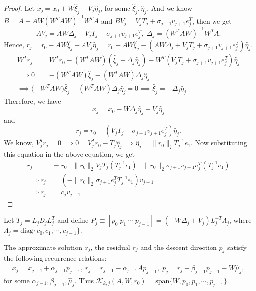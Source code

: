 \documentclass[10pt,a4paper]{article}
\begin{document}
\begin{proof}
Let $x_j=x_0+W\hat{\xi}_j+V_j\hat{\eta}_j$, for some $\hat{\xi}_j, \hat{\eta}_j.$ And we know $B=A-AW(W^TAW)^{-1}W^TA$ and $BV_j=V_jT_j+\sigma_{j+1}v_{j+1}e^T_j$, then we get $$AV_j=AW\Delta_j+V_jT_j+\sigma_{j+1}v_{j+1}e^T_j, \;\Delta_j=(W^TAW)^{-1}W^TA.$$
Hence, $r_j = r_0-AW\hat{\xi}_j-AV_j\hat{\eta}_j = r_0-AW\hat{\xi}_j-(AW\Delta_j+V_jT_j+\sigma_{j+1}v_{j+1}e^T_j)\hat{\eta}_j.$
\begin{align*}
W^Tr_j &= W^Tr_0-(W^TAW)(\hat{\xi}_j-\Delta_j\hat{\eta}_j)-W^T(V_jT_j+\sigma_{j+1}v_{j+1}e^T_j)\hat{\eta}_j \\
\implies 0 &= -(W^TAW)\hat{\xi}_j - (W^TAW)\Delta_j\hat{\eta}_j \\
\implies (&W^TAW)\hat{\xi}_j + (W^TAW)\Delta_j\hat{\eta}_j = 0 \implies \hat{\xi}_j = -\Delta_j\hat{\eta}_j
\end{align*}
Therefore, we have $$x_j = x_0-W\Delta_j\hat{\eta}_j+V_j\hat{\eta}_j$$ and $$r_j = r_0-(V_jT_j+\sigma_{j+1}v_{j+1}e^T_j)\hat{\eta}_j.$$
We know, $V_j^Tr_j=0\implies 0 = V_j^Tr_0-T_j\hat{\eta}_j\implies \hat{\eta}_j = \|r_0\|_2T^{-1}_je_1$. Now substituting this equation in the above equation, we get
\begin{align*}
r_j &= r_0-\|r_0\|_2V_jT_j(T^{-1}_je_1)-\|r_0\|_2\sigma_{j+1}v_{j+1}e^T_j(T^{-1}_je_1) \\
\implies r_j &= (-\|r_0\|_2\sigma_{j+1}e^T_jT^{-1}_je_1)v_{j+1} \\
\implies r_j &= c_jv_{j+1}
\end{align*}
\end{proof}

Let $T_j=L_jD_jL^T_j$ and define $P_j\equiv [p_0\;p_1\;\cdots\;p_{j-1}]=(-W\Delta_j+V_j)L^{-T}_j\Lambda_j$, where $\Lambda_j=\text{diag}\{c_0,c_1,\cdots,c_{j-1}\}.$

\begin{prop}
The approximate solution $x_j$, the residual $r_j$ and the descent direction $p_j$ satisfy the following recurrence relations:
\begin{align*}
x_j=x_{j-1}+\alpha_{j-1}p_{j-1},\;r_j=r_{j-1}-\alpha_{j-1}Ap_{j-1},\;p_j=r_j+\beta_{j-1}p_{j-1}-W\hat{\mu}_j,
\end{align*}
for some $\alpha_{j-1},\beta_{j-1},\hat{\mu}_j.$ Thus $\mathcal{K}_{k,j}(A,W,r_0)=\text{span}\{W,p_0,p_1,\cdots,p_{j-1}\}$.
\end{prop}
\end{document}
